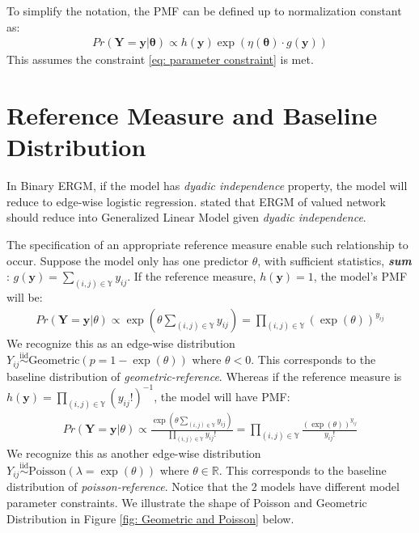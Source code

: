 \documentclass[12pt,a4paper,twoside,openany]{book}
\newcommand{\BI}[1]{\textit{\textbf{#1}}}
\begin{document}
To simplify the notation, the PMF can be defined up to normalization constant as:
\begin{align}
Pr(\bm{Y}=\bm{y}|\bm{\theta}) \propto h(\bm{y})\exp(\eta(\bm{\theta})\cdot g(\bm{y}))
\end{align}
This assumes the constraint \ref{eq: parameter constraint} is met.

\section{Reference Measure and Baseline Distribution}
In Binary ERGM, if the model has \textit{dyadic independence} property, the model will reduce to edge-wise logistic regression. 
\citet{countergmdefined} stated that ERGM of valued network should reduce into Generalized Linear Model given \textit{dyadic independence}.

The specification of an appropriate reference measure enable such relationship to occur. 
Suppose the model only has one predictor $\theta$, with sufficient statistics, \BI{sum} : $g(\bm{y}) = \sum_{(i,j) \in \mathbb{Y}} y_{ij}$. 
If the reference measure, $h(\bm{y}) = 1$, the model's PMF will be:
\begin{align}\label{eq: edgewise Geometric}
Pr(\bm{Y}=\bm{y}|\theta) \propto \exp\left(\theta \sum_{(i,j) \in \mathbb{Y}} y_{ij}\right) = \prod_{(i,j) \in \mathbb{Y}} (\exp(\theta))^{y_{ij}}
\end{align} 
We recognize this as an edge-wise distribution $Y_{ij}\stackrel{\text{iid}}{\sim}\text{Geometric}(p =1-\exp(\theta))$ where $\theta < 0$. This corresponds to the baseline distribution of \textit{geometric-reference}. 
Whereas  if the reference measure is $h(\bm{y}) = \prod_{(i,j) \in \mathbb{Y}}(y_{ij}!)^{-1}$, the model will have PMF:
\begin{align}\label{eq: edgewise Poisson}
Pr(\bm{Y}=\bm{y}|\theta) \propto \frac{\exp\left(\theta \sum_{(i,j) \in \mathbb{Y}} y_{ij}\right)}{\prod_{(i,j) \in \mathbb{Y}}y_{ij}!} = \prod_{(i,j) \in \mathbb{Y}} \frac{(\exp(\theta))^{y_{ij}}}{y_{ij}!}
\end{align}
We recognize this as another edge-wise distribution $Y_{ij}\stackrel{\text{iid}}{\sim}\text{Poisson}(\lambda =\exp(\theta))$ where $\theta \in \mathbb{R}$. 
This corresponds to the baseline distribution of \textit{poisson-reference}. 
Notice that the 2 models have different model parameter constraints. 
We illustrate the shape of Poisson and Geometric Distribution in Figure \ref{fig: Geometric and Poisson} below.
\end{document}
